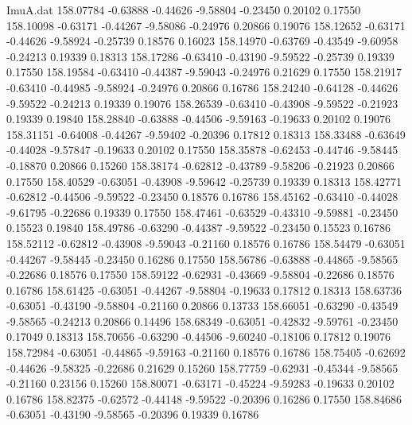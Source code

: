 \begin{filecontents}{ImuA.dat}
 158.07784   -0.63888   -0.44626   -9.58804   -0.23450    0.20102    0.17550
 158.10098   -0.63171   -0.44267   -9.58086   -0.24976    0.20866    0.19076
 158.12652   -0.63171   -0.44626   -9.58924   -0.25739    0.18576    0.16023
 158.14970   -0.63769   -0.43549   -9.60958   -0.24213    0.19339    0.18313
 158.17286   -0.63410   -0.43190   -9.59522   -0.25739    0.19339    0.17550
 158.19584   -0.63410   -0.44387   -9.59043   -0.24976    0.21629    0.17550
 158.21917   -0.63410   -0.44985   -9.58924   -0.24976    0.20866    0.16786
 158.24240   -0.64128   -0.44626   -9.59522   -0.24213    0.19339    0.19076
 158.26539   -0.63410   -0.43908   -9.59522   -0.21923    0.19339    0.19840
 158.28840   -0.63888   -0.44506   -9.59163   -0.19633    0.20102    0.19076
 158.31151   -0.64008   -0.44267   -9.59402   -0.20396    0.17812    0.18313
 158.33488   -0.63649   -0.44028   -9.57847   -0.19633    0.20102    0.17550
 158.35878   -0.62453   -0.44746   -9.58445   -0.18870    0.20866    0.15260
 158.38174   -0.62812   -0.43789   -9.58206   -0.21923    0.20866    0.17550
 158.40529   -0.63051   -0.43908   -9.59642   -0.25739    0.19339    0.18313
 158.42771   -0.62812   -0.44506   -9.59522   -0.23450    0.18576    0.16786
 158.45162   -0.63410   -0.44028   -9.61795   -0.22686    0.19339    0.17550
 158.47461   -0.63529   -0.43310   -9.59881   -0.23450    0.15523    0.19840
 158.49786   -0.63290   -0.44387   -9.59522   -0.23450    0.15523    0.16786
 158.52112   -0.62812   -0.43908   -9.59043   -0.21160    0.18576    0.16786
 158.54479   -0.63051   -0.44267   -9.58445   -0.23450    0.16286    0.17550
 158.56786   -0.63888   -0.44865   -9.58565   -0.22686    0.18576    0.17550
 158.59122   -0.62931   -0.43669   -9.58804   -0.22686    0.18576    0.16786
 158.61425   -0.63051   -0.44267   -9.58804   -0.19633    0.17812    0.18313
 158.63736   -0.63051   -0.43190   -9.58804   -0.21160    0.20866    0.13733
 158.66051   -0.63290   -0.43549   -9.58565   -0.24213    0.20866    0.14496
 158.68349   -0.63051   -0.42832   -9.59761   -0.23450    0.17049    0.18313
 158.70656   -0.63290   -0.44506   -9.60240   -0.18106    0.17812    0.19076
 158.72984   -0.63051   -0.44865   -9.59163   -0.21160    0.18576    0.16786
 158.75405   -0.62692   -0.44626   -9.58325   -0.22686    0.21629    0.15260
 158.77759   -0.62931   -0.45344   -9.58565   -0.21160    0.23156    0.15260
 158.80071   -0.63171   -0.45224   -9.59283   -0.19633    0.20102    0.16786
 158.82375   -0.62572   -0.44148   -9.59522   -0.20396    0.16286    0.17550
 158.84686   -0.63051   -0.43190   -9.58565   -0.20396    0.19339    0.16786

\end{filecontents}
